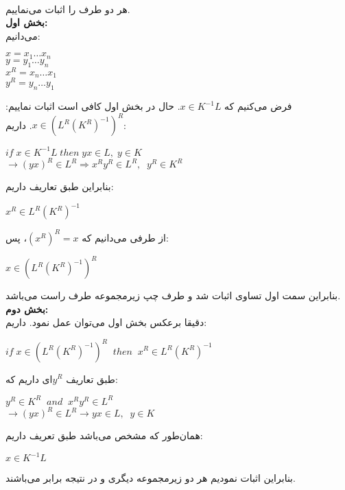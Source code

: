 \\[0.1in]
هر دو طرف را اثبات می‌نماییم.\\[0.1in]
\textbf{بخش اول:}\\[0.07in]
می‌دانیم:
\begin{center}
    $x = x_1 \ldots x_n$\\
    $y = y_1 \ldots y_n$\\
    $x^R = x_n \ldots x_1$\\
    $y^R = y_n \ldots y_1$
\end{center}
فرض می‌کنیم که
$x \in K^{-1}L$.
حال در بخش اول کافی است اثبات نماییم:
$x \in (L^R(K^R)^{-1})^R$. داریم:
\begin{center}
    $if \; x \in K^{-1}L \; then \; yx \in L, \; 
    y \in K$\\[0.07in]
    $\longrightarrow (yx)^R \in L^R \Longrightarrow
    x^Ry^R \in L^R, \; \; y^R \in K^R$
\end{center}
بنابراین طبق تعاریف داریم:
\begin{center}
    $x^R \in L^R(K^R)^{-1}$
\end{center}
از طرفی می‌دانیم که 
$(x^R)^R = x$،
پس:
\begin{center}
    $x \in (L^R(K^R)^{-1})^R$
\end{center}
بنابراین سمت اول تساوی اثبات شد و طرف چپ زیرمجموعه طرف راست می‌باشد.\\[0.2in]
\textbf{بخش دوم:}\\[0.07in]
دقیقا برعکس بخش اول می‌توان عمل نمود. داریم:
\begin{center}
    $if \; x \in (L^R(K^R)^{-1})^R \; \; then \; \; x^R \in L^R(K^R)^{-1}$
\end{center}
طبق تعاریف $y^R$ای داریم که:
\begin{center}
    $y^R \in K^R \; \; and \; \; x^Ry^R \in L^R$\\[0.07in]
    $\longrightarrow (yx)^R \in L^R \longrightarrow
    yx \in L,\; \; y \in K$
\end{center}
همان‌طور که مشخص می‌باشد طبق تعریف داریم:
\begin{center}
    $x \in K^{-1}L$
\end{center}
بنابراین اثبات نمودیم هر دو زیرمجموعه دیگری و در نتیجه برابر می‌باشند.\\[0.2in]